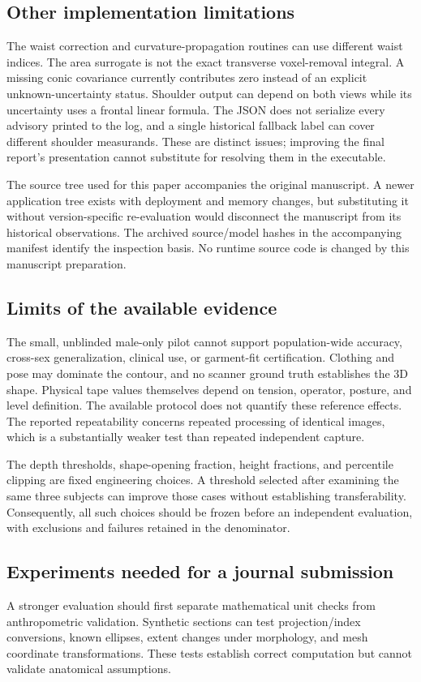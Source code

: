 \subsection{Other implementation limitations}
The waist correction and curvature-propagation routines can use different waist indices. The area surrogate is not the exact transverse voxel-removal integral. A missing conic covariance currently contributes zero instead of an explicit unknown-uncertainty status. Shoulder output can depend on both views while its uncertainty uses a frontal linear formula. The JSON does not serialize every advisory printed to the log, and a single historical fallback label can cover different shoulder measurands. These are distinct issues; improving the final report's presentation cannot substitute for resolving them in the executable.

The source tree used for this paper accompanies the original manuscript. A newer application tree exists with deployment and memory changes, but substituting it without version-specific re-evaluation would disconnect the manuscript from its historical observations. The archived source/model hashes in the accompanying manifest identify the inspection basis. No runtime source code is changed by this manuscript preparation.

\subsection{Limits of the available evidence}
The small, unblinded male-only pilot cannot support population-wide accuracy, cross-sex generalization, clinical use, or garment-fit certification. Clothing and pose may dominate the contour, and no scanner ground truth establishes the 3D shape. Physical tape values themselves depend on tension, operator, posture, and level definition. The available protocol does not quantify these reference effects. The reported repeatability concerns repeated processing of identical images, which is a substantially weaker test than repeated independent capture.

The depth thresholds, shape-opening fraction, height fractions, and percentile clipping are fixed engineering choices. A threshold selected after examining the same three subjects can improve those cases without establishing transferability. Consequently, all such choices should be frozen before an independent evaluation, with exclusions and failures retained in the denominator.

\subsection{Experiments needed for a journal submission}
A stronger evaluation should first separate mathematical unit checks from anthropometric validation. Synthetic sections can test projection/index conversions, known ellipses, extent changes under morphology, and mesh coordinate transformations. These tests establish correct computation but cannot validate anatomical assumptions.

